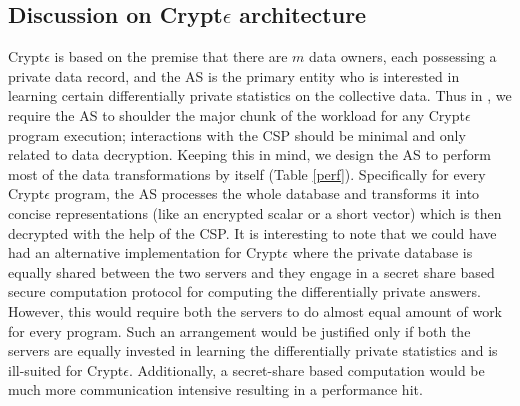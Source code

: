 \subsection{Discussion on Crypt$\epsilon$ architecture}\label{architecture}
 Crypt$\epsilon$  is based on the premise that there are $m$  data owners, each possessing a private data record, and the \textsf{AS} is the primary entity who is interested in learning certain differentially private statistics on the collective data.  Thus in \system, we require the \textsf{AS} to  shoulder the major chunk of the workload for any Crypt$\epsilon$ program execution; interactions with the \textsf{CSP} should be minimal and only related to data decryption.
Keeping this in  mind, we design the \textsf{AS} to perform most of the data transformations by itself (Table \ref{perf}). Specifically for every Crypt$\epsilon$ program, the \textsf{AS} processes the whole database and transforms it into concise representations (like an encrypted scalar or a short vector) which is then decrypted with the help of the \textsf{CSP}. It is interesting to note that we could have had an alternative implementation for Crypt$\epsilon$ where the private database is equally shared between the two servers and they engage in a secret share based secure computation protocol for computing the differentially private answers. However, this would require both the servers to do almost equal amount of work for every program. Such an arrangement would be justified only if both the servers are equally invested in learning the differentially private statistics and is ill-suited for Crypt$\epsilon$. Additionally, a secret-share based computation would be much more communication intensive resulting in a performance hit. 

